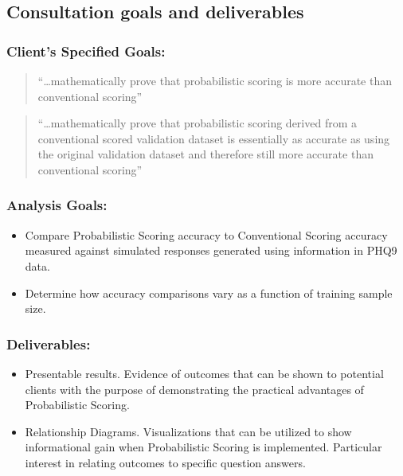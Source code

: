 \documentclass[12pt,]{article}
\providecommand{\tightlist}{%
  \setlength{\itemsep}{0pt}\setlength{\parskip}{0pt}}
\begin{document}
\hypertarget{consultation-goals-and-deliverables}{%
\subsection{Consultation goals and
deliverables}\label{consultation-goals-and-deliverables}}

\hypertarget{clients-specified-goals}{%
\subsubsection{Client's Specified
Goals:}\label{clients-specified-goals}}

\begin{quote}
``\ldots{}mathematically prove that probabilistic scoring is more
accurate than conventional scoring''
\end{quote}

\begin{quote}
``\ldots{}mathematically prove that probabilistic scoring derived from a
conventional scored validation dataset is essentially as accurate as
using the original validation dataset and therefore still more accurate
than conventional scoring''
\end{quote}

\hypertarget{analysis-goals}{%
\subsubsection{Analysis Goals:}\label{analysis-goals}}

\begin{itemize}
\tightlist
\item
  Compare Probabilistic Scoring accuracy to Conventional Scoring
  accuracy measured against simulated responses generated using
  information in PHQ9 data.
\item
  Determine how accuracy comparisons vary as a function of training
  sample size.
\end{itemize}

\hypertarget{deliverables}{%
\subsubsection{Deliverables:}\label{deliverables}}

\begin{itemize}
\tightlist
\item
  Presentable results. Evidence of outcomes that can be shown to
  potential clients with the purpose of demonstrating the practical
  advantages of Probabilistic Scoring.
\item
  Relationship Diagrams. Visualizations that can be utilized to show
  informational gain when Probabilistic Scoring is implemented.
  Particular interest in relating outcomes to specific question answers.
\end{itemize}
\end{document}
